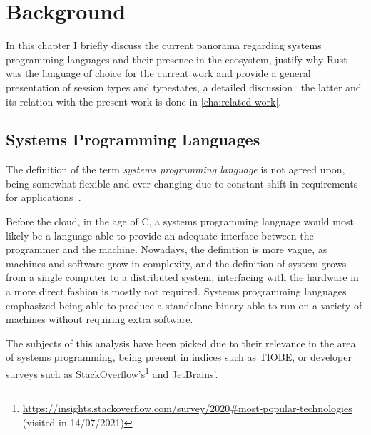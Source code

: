 

\chapter{Background}\label{cha:background}

In this chapter I briefly discuss the current panorama regarding systems programming languages and their presence in the ecosystem,
justify why Rust was the language of choice for the current work and
provide a general presentation of session types and typestates,
a detailed discussion \wrt~the latter and its relation with the present work is done in \autoref{cha:related-work}.

\section{Systems Programming Languages}\label{sec:systems-programming}

The definition of the term \emph{systems programming language} is not agreed upon,
being somewhat flexible and ever-changing due to constant shift in requirements for applications~\autocite{Torre2014}.

Before the cloud, in the age of C, a systems programming language would
most likely be a language able to provide an adequate interface between the programmer and the machine.
Nowadays, the definition is more vague, as machines and software grow in complexity,
and the definition of system grows from a single computer to a distributed system,
interfacing with the hardware in a more direct fashion is mostly not required.
Systems programming languages emphasized being able to produce a standalone
binary able to run on a variety of machines without requiring extra software.

The subjects of this analysis have been picked due to their relevance in the area of systems programming,
being present in indices such as TIOBE,
or developer surveys such as StackOverflow's\footnote{\url{https://insights.stackoverflow.com/survey/2020\#most-popular-technologies}\\(visited in 14/07/2021)} and
JetBrains'.

